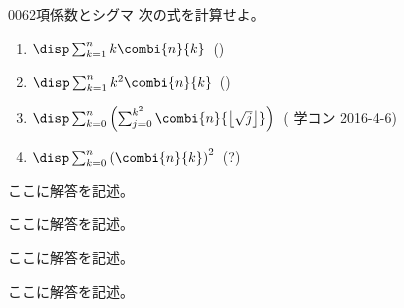 \begin{prob}{006}{}{2項係数とシグマ}
 次の式を計算せよ。
 \begin{enumerate}
  \item $\disp \sum_{k=1}^n k \combi{n}{k}$~()
  \item $\disp \sum_{k=1}^n k^2 \combi{n}{k}$~()
  \item $\disp \sum_{k=0}^n \left(\sum_{j=0}^{k^2} \combi{n}{\left\lfloor \sqrt{j} \right\rfloor}\right)$~( 学コン 2016-4-6)
  \item $\disp \sum_{k=0}^n \left(\combi{n}{k}\right)^2$~(\hosi ?)
 \end{enumerate}
\end{prob}
ここに解答を記述。

ここに解答を記述。

ここに解答を記述。

ここに解答を記述。